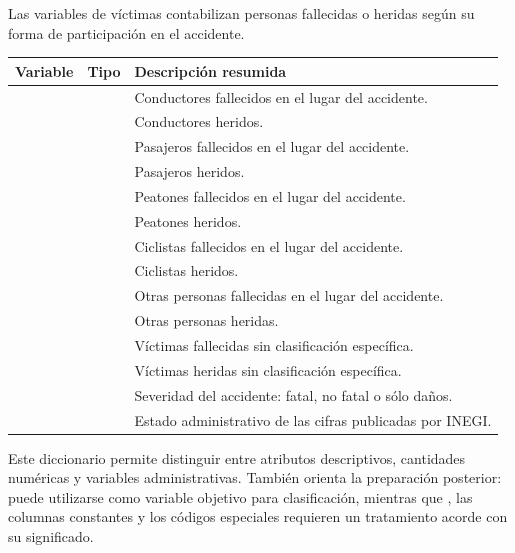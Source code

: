 \documentclass[11pt,letterpaper]{article}
\begin{document}
\begin{nota}
\small
Las variables de víctimas contabilizan personas fallecidas o heridas según su
forma de participación en el accidente.

\vspace{0.4em}
\begin{tabularx}{\textwidth}{L{3cm}L{1.45cm}Y}
    \toprule
    \textbf{Variable} & \textbf{Tipo} & \textbf{Descripción resumida} \\
    \midrule
     &  & Conductores fallecidos en el lugar del accidente. \\
     &  & Conductores heridos. \\
     &  & Pasajeros fallecidos en el lugar del accidente. \\
     &  & Pasajeros heridos. \\
     &  & Peatones fallecidos en el lugar del accidente. \\
     &  & Peatones heridos. \\
     &  & Ciclistas fallecidos en el lugar del accidente. \\
     &  & Ciclistas heridos. \\
     &  & Otras personas fallecidas en el lugar del accidente. \\
     &  & Otras personas heridas. \\
     &  & Víctimas fallecidas sin clasificación específica. \\
     &  & Víctimas heridas sin clasificación específica. \\
     &  & Severidad del accidente: fatal, no fatal o sólo daños. \\
     &  & Estado administrativo de las cifras publicadas por INEGI. \\
    \bottomrule
\end{tabularx}
\end{nota}

\begin{nota}
Este diccionario permite distinguir entre atributos descriptivos, cantidades
numéricas y variables administrativas. También orienta la preparación posterior:
 puede utilizarse como variable objetivo para clasificación,
mientras que , las columnas constantes y los códigos especiales
requieren un tratamiento acorde con su significado.
\end{nota}
\end{document}
